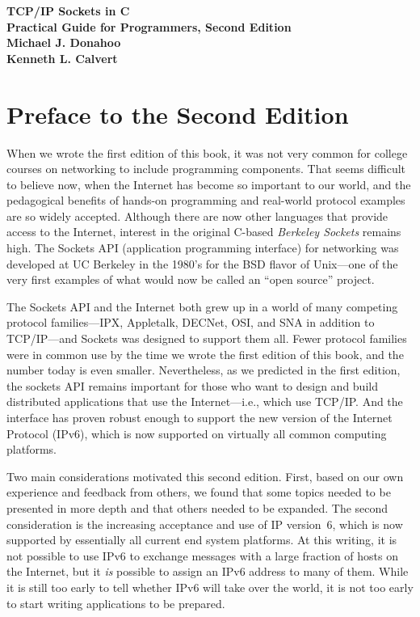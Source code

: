 \newpage
\thispagestyle{empty}
\vfill
\begin{center}
{\Huge\textbf{TCP/IP Sockets in C}} \\
{\Large\textbf{Practical Guide for Programmers, Second Edition}  \\[.2in]}
{\bf Michael J. Donahoo \\
Kenneth L. Calvert \\[.2in]}
\end{center}

\section*{Preface to the Second Edition}

When we wrote the first edition of this book, it was not very common
for college courses on networking to include programming components.
That seems difficult to believe now, when the Internet has become so
important to our world, and the pedagogical benefits of hands-on programming
and real-world protocol examples are so widely accepted.
%
Although there are now other languages that provide access
to the Internet, interest in the
original C-based \emph{Berkeley Sockets} remains high.
The Sockets  API (application programming interface) for
networking was developed at UC Berkeley in the 1980's
for the BSD flavor of Unix---one of the very first
examples of what would now be called an ``open source'' project.

The Sockets API and the Internet both grew up in a world of many
competing protocol families---IPX, Appletalk, DECNet, OSI, and SNA in
addition to TCP/IP---and Sockets was designed to support them all.
Fewer protocol families were in common use by the time we wrote the
first edition of this book, and the number today is even smaller.
Nevertheless,  as we predicted in the first edition, the sockets API remains
important for those who want to design and build distributed
applications that use the Internet---i.e., which use TCP/IP.
And the interface has proven robust enough
to support the new version of the Internet Protocol (IPv6), which is
now supported on virtually all common computing platforms.

Two main considerations motivated this second edition.
First, based on our own experience and feedback from others,
we found that some topics needed to be presented in more
depth and that others needed to be expanded.
%
The second consideration is the increasing acceptance and use of IP
version~6, which is now supported by essentially all current end
system platforms.  At this writing, it is not possible to use IPv6 to
exchange messages with a large fraction of hosts on the Internet, but
it \emph{is\/} possible to assign an IPv6 address to many of them.
While it is still too early to tell whether IPv6 will take over the
world, it is not too early to start writing applications to be
prepared.

